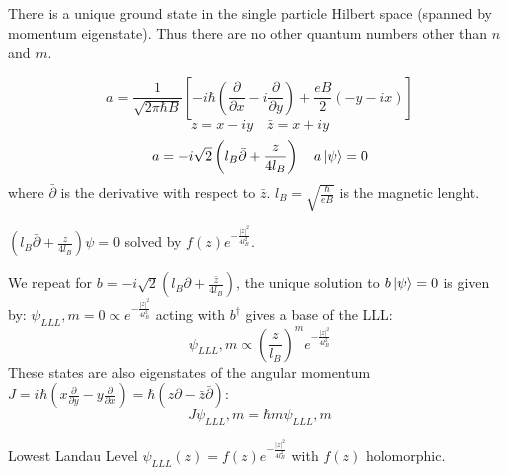 \documentclass{beamer}
\begin{document}

\begin{frame}
\begin{center}

There is a unique ground state in the single particle Hilbert space (spanned by momentum eigenstate). Thus there are no other quantum numbers other than $n$ and $m$.

\[
a = \frac{1}{\sqrt{2 \pi \hbar B}} \left[ - i \hbar \left( \frac{\partial }{\partial x} - i \frac{\partial }{\partial y} \right) + \frac{eB}{2} \left( -y -i x \right) \right]
\]
\[
z = x - i y \quad \bar{z} = x+iy
\]
\[
a = -i \sqrt{2} \left( l_B \bar{\partial} + \frac{z}{4 l_B} \right)
\quad a \ket{\psi} = 0
\]
where $\bar{\partial}$ is the derivative with respect to $\bar{z}$. $l_B = \sqrt{\frac{\hbar}{e B}}$ is the magnetic lenght. 

$ \left( l_B \bar{\partial} + \frac{z}{4 l_B} \right) \psi = 0 $ solved by $f(z) e^{-\frac{|z|^2}{4 l_B^2}}$.

\end{center}
\end{frame}

\begin{frame}
\begin{center}

We repeat for $b = -i \sqrt{2} \left( l_B \partial + \frac{\bar{z}}{4 l_B} \right)$, the unique solution to $b \ket{\psi} = 0$ is given by: $\psi_{LLL}, m = 0 \propto e^{-\frac{|z|^2}{4 l_B^2}}$
acting with $b^{\dagger}$ gives a base of the LLL:
\[
\psi_{LLL}, m \propto \left( \frac{z}{l_B} \right)^m e^{-\frac{|z|^2}{4 l_B^2}}
\]
These states are also eigenstates of the angular momentum $J = i \hbar \left( x \frac{\partial}{\partial y} - y \frac{\partial}{\partial x} 	\right) = \hbar \left( z \partial - \bar{z} \bar{\partial} \right)$:
\[
J \psi_{LLL}, m = \hbar m \psi_{LLL}, m
\]


\begin{block}{Lowest Landau Level}
\centering
$\psi_{LLL} (z) = f(z) e^{-\frac{|z|^2}{4 l_B^2}}$ with $f(z)$ holomorphic.
\centering
\end{block}

\end{center}
\end{frame}
\end{document}
